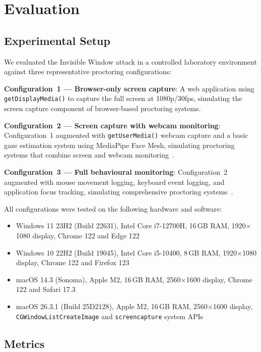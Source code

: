 \documentclass[conference]{IEEEtran}
\begin{document}
\section{Evaluation}

\subsection{Experimental Setup}

We evaluated the Invisible Window attack in a controlled laboratory environment against three representative proctoring configurations:

\textbf{Configuration~1 --- Browser-only screen capture}: A web application using \texttt{getDisplayMedia()} to capture the full screen at 1080p/30fps, simulating the screen capture component of browser-based proctoring systems.

\textbf{Configuration~2 --- Screen capture with webcam monitoring}: Configuration~1 augmented with \texttt{getUserMedia()} webcam capture and a basic gaze estimation system using MediaPipe Face Mesh, simulating proctoring systems that combine screen and webcam monitoring~\cite{kaddoura2023computational}.

\textbf{Configuration~3 --- Full behavioural monitoring}: Configuration~2 augmented with mouse movement logging, keyboard event logging, and application focus tracking, simulating comprehensive proctoring systems~\cite{dilini2021cheating,guan2021design}.

All configurations were tested on the following hardware and software:
\begin{itemize}
\item Windows 11 23H2 (Build 22631), Intel Core i7-12700H, 16\,GB RAM, 1920$\times$1080 display, Chrome 122 and Edge 122
\item Windows 10 22H2 (Build 19045), Intel Core i5-10400, 8\,GB RAM, 1920$\times$1080 display, Chrome 122 and Firefox 123
\item macOS 14.3 (Sonoma), Apple M2, 16\,GB RAM, 2560$\times$1600 display, Chrome 122 and Safari 17.3
\item macOS 26.3.1 (Build 25D2128), Apple M2, 16\,GB RAM, 2560$\times$1600 display, \texttt{CGWindowListCreateImage} and \texttt{screencapture} system APIs
\end{itemize}

\subsection{Metrics}
\end{document}
